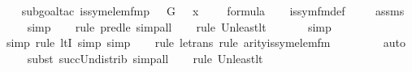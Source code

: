 \begin{isabellebody}
%
\isadelimproof
\isanewline
\ \ %
\endisadelimproof
%
\isatagproof
{}\isamarkupfalse%
{\isacharparenleft}{\kern0pt}subgoal{\isacharunderscore}{\kern0pt}tac\ {\isachardoublequoteopen}is{\isacharunderscore}{\kern0pt}sym{\isacharunderscore}{\kern0pt}elem{\isacharunderscore}{\kern0pt}fm{\isacharparenleft}{\kern0pt}p\ {\isacharhash}{\kern0pt}{\isacharplus}{\kern0pt}\ {}{\isacharcomma}{\kern0pt}\ G\ {\isacharhash}{\kern0pt}{\isacharplus}{\kern0pt}\ {}{\isacharcomma}{\kern0pt}\ x\ {\isacharhash}{\kern0pt}{\isacharplus}{\kern0pt}\ {}{\isacharcomma}{\kern0pt}\ {}{\isacharparenright}{\kern0pt}\ {\isasymin}\ formula{\isachardoublequoteclose}{\isacharparenright}{\kern0pt}\isanewline
\ \ \isamarkupfalse%
\ is{\isacharunderscore}{\kern0pt}sym{\isacharunderscore}{\kern0pt}fm{\isacharunderscore}{\kern0pt}def\ \isanewline
\ \ \isamarkupfalse%
\ assms\isanewline
\ \ \isamarkupfalse%
\ simp\isanewline
\ \ \ \isamarkupfalse%
{\isacharparenleft}{\kern0pt}rule\ pred{\isacharunderscore}{\kern0pt}le{\isacharcomma}{\kern0pt}\ simp{\isacharunderscore}{\kern0pt}all{\isacharparenright}{\kern0pt}{\isacharplus}{\kern0pt}\isanewline
\ \ \ \isamarkupfalse%
{\isacharparenleft}{\kern0pt}rule\ Un{\isacharunderscore}{\kern0pt}least{\isacharunderscore}{\kern0pt}lt{\isacharparenright}{\kern0pt}{\isacharplus}{\kern0pt}\isanewline
\ \ \ \ \ \isamarkupfalse%
\ simp\isanewline
\ \ \ \ \isamarkupfalse%
{\isacharparenleft}{\kern0pt}simp{\isacharcomma}{\kern0pt}\ rule\ ltI{\isacharcomma}{\kern0pt}\ simp{\isacharcomma}{\kern0pt}\ simp{\isacharparenright}{\kern0pt}\isanewline
\ \ \ \isamarkupfalse%
{\isacharparenleft}{\kern0pt}rule\ le{\isacharunderscore}{\kern0pt}trans{\isacharcomma}{\kern0pt}\ rule\ arity{\isacharunderscore}{\kern0pt}is{\isacharunderscore}{\kern0pt}sym{\isacharunderscore}{\kern0pt}elem{\isacharunderscore}{\kern0pt}fm{\isacharparenright}{\kern0pt}\isanewline
\ \ \ \ \ \ \ \isamarkupfalse%
\ auto{\isacharbrackleft}{\kern0pt}{}{\isacharbrackright}{\kern0pt}\isanewline
\ \ \ \isamarkupfalse%
{\isacharparenleft}{\kern0pt}subst\ succ{\isacharunderscore}{\kern0pt}Un{\isacharunderscore}{\kern0pt}distrib{\isacharcomma}{\kern0pt}\ simp{\isacharunderscore}{\kern0pt}all{\isacharparenright}{\kern0pt}{\isacharplus}{\kern0pt}\isanewline
\ \ \ \isamarkupfalse%
{\isacharparenleft}{\kern0pt}rule\ Un{\isacharunderscore}{\kern0pt}least{\isacharunderscore}{\kern0pt}lt{\isacharparenright}{\kern0pt}{\isacharplus}{\kern0pt}\isanewline

\end{isabellebody}
